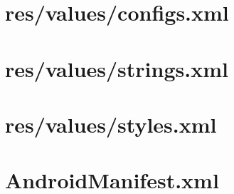 \documentclass[12pt]{jreport}
\renewcommand{\slash}{/}
\begin{document}
    \section{res\slash values\slash configs.xml}
    

    \section{res\slash values\slash strings.xml}
    

    \section{res\slash values\slash styles.xml}
    

    \section{AndroidManifest.xml}
    
\end{document}
